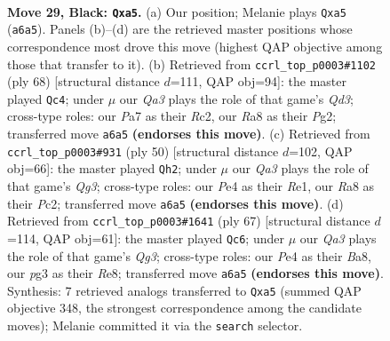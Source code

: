 \documentclass[11pt]{article}
\begin{document}
\clearpage

\begin{figure}[p]\centering
\begin{subfigure}{0.46\textwidth}\centering
\resizebox{\linewidth}{!}{%
\newchessgame
\chessboard[
  setfen={r1r5/pppb1k2/q1n2p2/PPQ5/3Pp3/6P1/8/RNB2RK1 b - - 0 29},
  showmover=false,
  pgfstyle=straightmove, color=movearrow, markmove={a6-a5}
]}
\caption{}
\end{subfigure}\hfill
\begin{subfigure}{0.46\textwidth}\centering
\resizebox{\linewidth}{!}{%
\newchessgame
\chessboard[
  setfen={1rr1b2k/5pp1/2P4p/1P1q4/3pp2P/1R1Q4/2RN1PP1/6K1 w - - 0 35},
  showmover=false,
  pgfstyle=straightmove, color=movearrow, markmove={d3-c4}
]}
\caption{}
\end{subfigure}
\\[4pt]
\begin{subfigure}{0.46\textwidth}\centering
\resizebox{\linewidth}{!}{%
\newchessgame
\chessboard[
  setfen={r3r1k1/2Bq2bp/1pp2p2/p1n5/2P1P2p/3P2Q1/2P1N1P1/4RR1K w - - 0 26},
  showmover=false,
  pgfstyle=straightmove, color=movearrow, markmove={g3-h2}
]}
\caption{}
\end{subfigure}\hfill
\begin{subfigure}{0.46\textwidth}\centering
\resizebox{\linewidth}{!}{%
\newchessgame
\chessboard[
  setfen={b3r1k1/6p1/pr4q1/1p1p3p/4nQ1N/2P3P1/PP4BP/2R1R1K1 b - - 5 34},
  showmover=false,
  pgfstyle=straightmove, color=movearrow, markmove={g6-c6}
]}
\caption{}
\end{subfigure}
\caption{\textbf{Move 29, Black: \texttt{Qxa5}.} (a) Our position; Melanie plays \texttt{Qxa5} (\texttt{a6a5}). Panels (b)--(d) are the retrieved master positions whose correspondence most drove this move (highest QAP objective among those that transfer to it). (b) Retrieved from \texttt{ccrl\_top\_p0003\#1102} (ply 68) [structural distance $d$=111, QAP obj=94]: the master played \texttt{Qc4}; under $\mu$ our \emph{Qa3} plays the role of that game's \emph{Qd3}; cross-type roles: our \emph{P}a7 as their \emph{R}c2, our \emph{R}a8 as their \emph{P}g2; transferred move \texttt{a6a5} \textbf{(endorses this move)}. (c) Retrieved from \texttt{ccrl\_top\_p0003\#931} (ply 50) [structural distance $d$=102, QAP obj=66]: the master played \texttt{Qh2}; under $\mu$ our \emph{Qa3} plays the role of that game's \emph{Qg3}; cross-type roles: our \emph{P}e4 as their \emph{R}e1, our \emph{R}a8 as their \emph{P}c2; transferred move \texttt{a6a5} \textbf{(endorses this move)}. (d) Retrieved from \texttt{ccrl\_top\_p0003\#1641} (ply 67) [structural distance $d$=114, QAP obj=61]: the master played \texttt{Qc6}; under $\mu$ our \emph{Qa3} plays the role of that game's \emph{Qg3}; cross-type roles: our \emph{P}e4 as their \emph{B}a8, our \emph{p}g3 as their \emph{R}e8; transferred move \texttt{a6a5} \textbf{(endorses this move)}. Synthesis: 7 retrieved analogs transferred to \texttt{Qxa5} (summed QAP objective 348, the strongest correspondence among the candidate moves); Melanie committed it via the \texttt{search} selector.}
\label{fig:thought-m57}
\end{figure}
\end{document}
